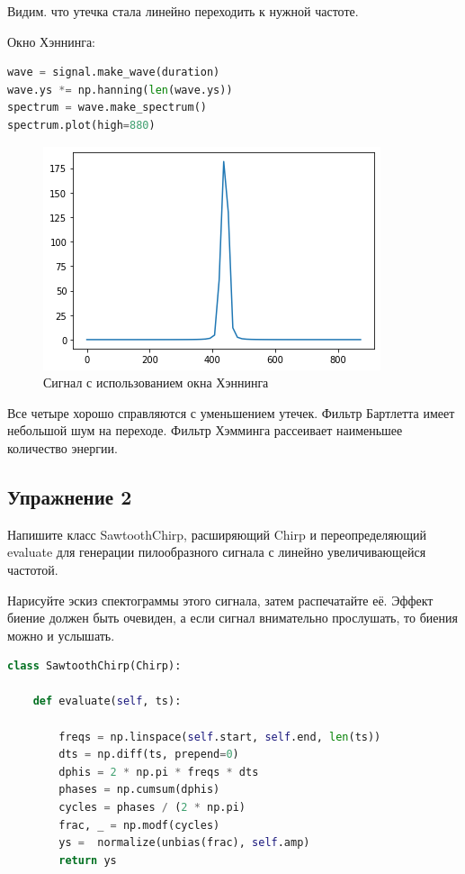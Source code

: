 Видим. что утечка стала линейно переходить к нужной частоте.

Окно Хэннинга:
\begin{lstlisting}[language=Python]
wave = signal.make_wave(duration)
wave.ys *= np.hanning(len(wave.ys))
spectrum = wave.make_spectrum()
spectrum.plot(high=880)
\end{lstlisting}
\begin{figure}[H]
	\begin{center}
		\includegraphics[scale=1]{fig/lab03/lab03_15_0.png}
		\caption{Сигнал с использованием окна Хэннинга}
	\end{center}
\end{figure}

Все четыре хорошо справляются с уменьшением утечек. Фильтр Бартлетта имеет небольшой шум на переходе. Фильтр Хэмминга рассеивает наименьшее количество энергии.
\subsection{Упражнение 2}


Напишите класс SawtoothChirp, расширяющий Chirp и переопределяющий evaluate для генерации пилообразного сигнала с линейно увеличивающейся частотой.

\noindent Нарисуйте эскиз спектограммы этого сигнала, затем распечатайте её. Эффект биение должен быть очевиден, а если сигнал внимательно прослушать, то биения можно и услышать.

\begin{lstlisting}[language=Python]
class SawtoothChirp(Chirp):

    def evaluate(self, ts):
        
        freqs = np.linspace(self.start, self.end, len(ts))
        dts = np.diff(ts, prepend=0)
        dphis = 2 * np.pi * freqs * dts
        phases = np.cumsum(dphis)
        cycles = phases / (2 * np.pi)
        frac, _ = np.modf(cycles)
        ys =  normalize(unbias(frac), self.amp)
        return ys
\end{lstlisting}

